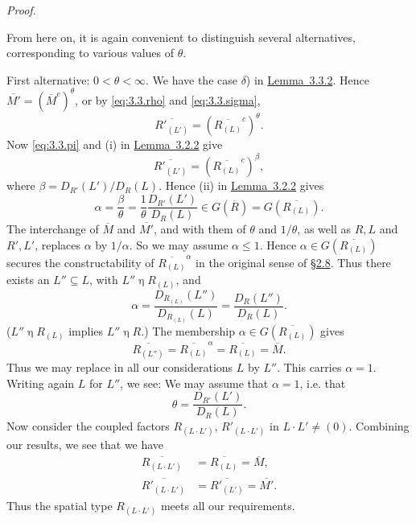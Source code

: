 \documentclass[b5paper,twoside]{article}
\newcommand{\secref}[2]{\hyperref[#1]{\mbox{\S#2}}}
\newcommand{\lemref}[2]{\hyperref[#1]{\mbox{Lemma~#2}}}
\theoremstyle{mvnplain}
\renewenvironment{proof}[1][Proof]{%
  \par\addvspace{0.35\baselineskip}%
  \noindent\textit{#1.}\ \normalfont\ignorespaces
}{%
  \par\addvspace{0.35\baselineskip}%
}
\newcommand{\M}{\mathbf M}
\newcommand{\R}{\mathbf R}
\def\M{M}%
\def\R{R}%
\def\widetilde#1{#1}%
\def\mathfrak#1{#1}%
\begin{document}
\begin{proof}
From here on, it is again convenient to distinguish several alternatives,
corresponding to various values of \(\theta\).

First alternative: \(0<\theta<\infty\). We have the case \(\delta\)) in
\lemref{lem:3.3.2}{3.3.2}. Hence
\(\overline{\M'}=(\overline{\M}^{c})^\theta\), or by
\eqref{eq:3.3.rho} and \eqref{eq:3.3.sigma},
\[
  \overline{\R'_{(\mathfrak L')}}
 =\left(\overline{\R_{(\mathfrak L)}}^{c}\right)^\theta.
\]
Now \eqref{eq:3.3.pi} and (i) in \lemref{lem:3.2.2}{3.2.2} give
\[
  \overline{\R'_{(\mathfrak L')}}
 =\left(\overline{\R_{(\mathfrak L)}}^{c}\right)^\beta,
\]
where \(\beta=D_{\R'}(\mathfrak L')/D_{\R}(\mathfrak L)\). Hence (ii) in
\lemref{lem:3.2.2}{3.2.2} gives
\[
  \alpha=\frac{\beta}{\theta}
  =\frac1\theta\frac{D_{\R'}(\mathfrak L')}{D_{\R}(\mathfrak L)}
  \in\mathfrak G(\widetilde{\overline{\R}})
  =\mathfrak G(\overline{\R_{(\mathfrak L)}}).
\]
The interchange of \(\overline{\M}\) and \(\overline{\M'}\), and with them
of \(\theta\) and \(1/\theta\), as well as \(\R,\mathfrak L\) and
\(\R',\mathfrak L'\), replaces \(\alpha\) by \(1/\alpha\). So we may
assume \(\alpha\leq1\). Hence
\(\alpha\in\mathfrak G(\overline{\R_{(\mathfrak L)}})\) secures the
constructability of \(\overline{\R_{(\mathfrak L)}}^{\alpha}\) in the original
sense of \secref{sec:2.8}{2.8}. Thus there exists an
\(\mathfrak L''\subseteq\mathfrak L\), with
\(\mathfrak L''\mathrel{\eta}\R_{(\mathfrak L)}\), and
\[
  \alpha
  =\frac{D_{\R_{(\mathfrak L)}}(\mathfrak L'')}
          {D_{\R_{(\mathfrak L)}}(\mathfrak L)}
  =\frac{D_{\R}(\mathfrak L'')}{D_{\R}(\mathfrak L)}.
\]
(\(\mathfrak L''\mathrel{\eta}\R_{(\mathfrak L)}\) implies
\(\mathfrak L''\mathrel{\eta}\R\).) The membership
\(\alpha\in\mathfrak G(\overline{\R_{(\mathfrak L)}})\) gives
\[
  \overline{\R_{(\mathfrak L'')}}
  =\overline{\R_{(\mathfrak L)}}^{\alpha}
  =\overline{\R_{(\mathfrak L)}}=\overline{\M}.
\]
Thus we may replace in all our considerations \(\mathfrak L\) by
\(\mathfrak L''\). This carries \(\alpha=1\). Writing again
\(\mathfrak L\) for \(\mathfrak L''\), we see: We may assume that
\(\alpha=1\), i.e. that
\[
  \theta=\frac{D_{\R'}(\mathfrak L')}{D_{\R}(\mathfrak L)}.
\]
Now consider the coupled factors
\(\R_{(\mathfrak L\cdot\mathfrak L')}\),
\(\R'_{(\mathfrak L\cdot\mathfrak L')}\) in
\(\mathfrak L\cdot\mathfrak L'\ne(0)\). Combining our results, we see that
we have
\[
\begin{aligned}
\overline{\R_{(\mathfrak L\cdot\mathfrak L')}}
  &=\overline{\R_{(\mathfrak L)}}=\overline{\M},\\
\overline{\R'_{(\mathfrak L\cdot\mathfrak L')}}
  &=\overline{\R'_{(\mathfrak L')}}=\overline{\M'}.
\end{aligned}
\]
Thus the spatial type
\(\widetilde{\R}_{(\mathfrak L\cdot\mathfrak L')}\) meets all our
requirements.


\end{proof}
\end{document}

